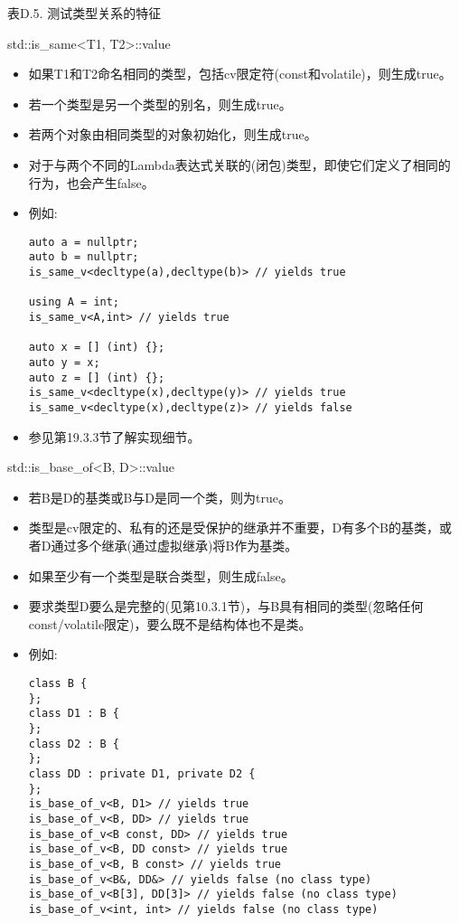 \begin{center}
表D.5. 测试类型关系的特征
\end{center}

std::is\_same<T1, T2>::value

\begin{itemize}
\item
如果T1和T2命名相同的类型，包括cv限定符(const和volatile)，则生成true。

\item
若一个类型是另一个类型的别名，则生成true。

\item
若两个对象由相同类型的对象初始化，则生成true。

\item
对于与两个不同的Lambda表达式关联的(闭包)类型，即使它们定义了相同的行为，也会产生false。

\item
例如:
\begin{lstlisting}[style=styleCXX]
auto a = nullptr;
auto b = nullptr;
is_same_v<decltype(a),decltype(b)> // yields true

using A = int;
is_same_v<A,int> // yields true

auto x = [] (int) {};
auto y = x;
auto z = [] (int) {};
is_same_v<decltype(x),decltype(y)> // yields true
is_same_v<decltype(x),decltype(z)> // yields false
\end{lstlisting}

\item
参见第19.3.3节了解实现细节。
\end{itemize}

std::is\_base\_of<B, D>::value

\begin{itemize}
\item
若B是D的基类或B与D是同一个类，则为true。

\item
类型是cv限定的、私有的还是受保护的继承并不重要，D有多个B的基类，或者D通过多个继承(通过虚拟继承)将B作为基类。

\item
如果至少有一个类型是联合类型，则生成false。

\item
要求类型D要么是完整的(见第10.3.1节)，与B具有相同的类型(忽略任何const/volatile限定)，要么既不是结构体也不是类。

\item
例如:
\begin{lstlisting}[style=styleCXX]
class B {
};
class D1 : B {
};
class D2 : B {
};
class DD : private D1, private D2 {
};
is_base_of_v<B, D1> // yields true
is_base_of_v<B, DD> // yields true
is_base_of_v<B const, DD> // yields true
is_base_of_v<B, DD const> // yields true
is_base_of_v<B, B const> // yields true
is_base_of_v<B&, DD&> // yields false (no class type)
is_base_of_v<B[3], DD[3]> // yields false (no class type)
is_base_of_v<int, int> // yields false (no class type)
\end{lstlisting}
\end{itemize}

